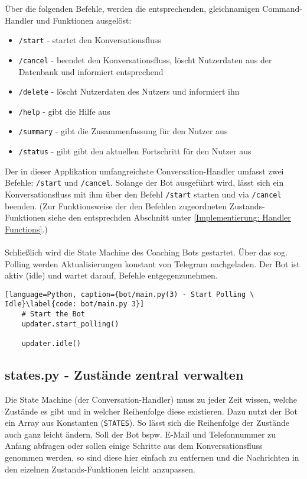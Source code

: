         Über die folgenden Befehle, werden die entsprechenden, gleichnamigen Command-Handler und Funktionen ausgelöst: 
        \begin{itemize}
            \item \verb|/start| - startet den Konversationsfluss
            \item \verb|/cancel| - beendet den Konversationsfluss, löscht Nutzerdaten aus der Datenbank und informiert entsprechend
            \item \verb|/delete| - löscht Nutzerdaten des Nutzers und informiert ihn
            \item \verb|/help| - gibt die Hilfe aus
            \item \verb|/summary| - gibt die Zusammenfassung für den Nutzer aus
            \item \verb|/status| - gibt gibt den aktuellen Fortschritt für den Nutzer aus
        \end{itemize}
        Der in dieser Applikation umfangreichste Conversation-Handler umfasst zwei Befehle: \verb|/start| und \verb|/cancel|. Solange der Bot ausgeführt wird, lässt sich ein Konversationsfluss mit ihm über den Befehl \verb|/start| starten und via \verb|/cancel| beenden. (Zur Funktionsweise der den Befehlen zugeordneten Zustands-Funktionen siehe den entsprechden Abschnitt unter \ref{Implementierung: Handler Functions}.) \\ \\
        
        Schließlich wird die State Machine des Coaching Bots gestartet. Über das sog. Polling werden Aktualisierungen konstant von Telegram nachgeladen. Der Bot ist aktiv (idle) und wartet darauf, Befehle entgegenzunehmen.
        \begin{lstlisting}[language=Python, caption={bot/main.py(3) - Start Polling \ Idle}\label{code: bot/main.py 3}]
    # Start the Bot
    updater.start_polling()

    updater.idle()
        \end{lstlisting}

        \subsection{states.py - Zustände zentral verwalten} \label{Implementierung: states.py}
            Die State Machine (der Conversation-Handler) muss zu jeder Zeit wissen, welche Zustände es gibt und in welcher Reihenfolge diese existieren. Dazu nutzt der Bot ein Array aus Konstanten (\verb|STATES|). So lässt sich die Reihenfolge der Zustände auch ganz leicht ändern. Soll der Bot bspw. E-Mail und Telefonnummer zu Anfang abfragen oder sollen einige Schritte aus dem Konversationsfluss genommen werden, so sind diese hier einfach zu entfernen und die Nachrichten in den eizelnen Zustands-Funktionen leicht anzupassen.\\
    
